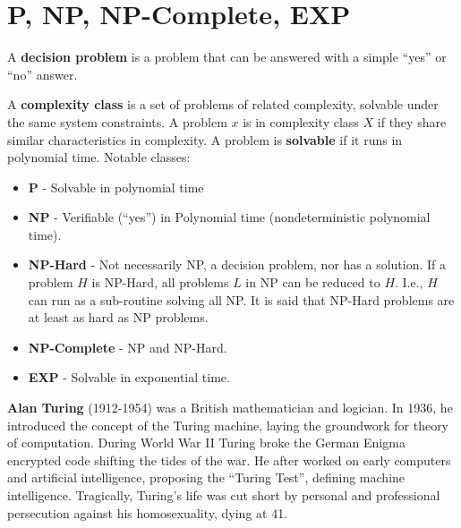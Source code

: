 \section{P, NP, NP-Complete, EXP}

\label{sec:hard}
\begin{Def}

    A \textbf{decision problem} is a problem that can be answered with a simple ``yes'' or ``no'' answer.
\end{Def}

\begin{Def}

    A \textbf{complexity class} is a set of problems of related complexity,
    solvable under the same system constraints. A problem $x$ is in complexity class $X$ if they
    share similar characteristics in complexity. A problem is \textbf{solvable} if it runs 
    in polynomial time. Notable classes:

    \begin{itemize}
        \item \textbf{P} - Solvable in polynomial time
        \item \textbf{NP} - Verifiable (``yes'') in Polynomial time (nondeterministic polynomial time).
        \item \textbf{NP-Hard} - Not necessarily NP, a decision problem, nor has a solution. 
        If a problem $H$ is NP-Hard, all problems $L$ in NP can be reduced to $H$. I.e., $H$ can run as a sub-routine solving all NP.
        It is said that NP-Hard problems are at least as hard as NP problems.
        \item \textbf{NP-Complete} - NP and NP-Hard. 
        \item \textbf{EXP} - Solvable in exponential time.
    \end{itemize}

\end{Def}

\begin{Tip}
    \textbf{Alan Turing} (1912-1954) was a British mathematician and logician. In 1936, he introduced the concept of the Turing machine, laying the groundwork for theory of computation. During World War II Turing broke the German Enigma encrypted code shifting the tides of the war. 
    He after worked on early computers and artificial intelligence, proposing the ``Turing Test'', defining machine intelligence. Tragically, Turing's life was cut short by personal and professional persecution against his homosexuality, dying at 41.
\end{Tip}

